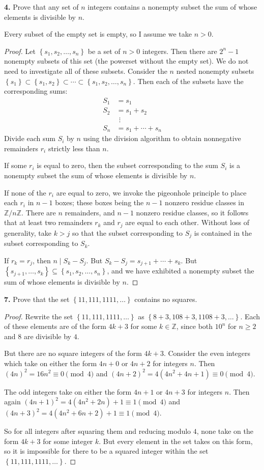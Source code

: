 \documentclass[11pt]{article}
\newcommand{\cbr}[1]{\left\{#1\right\}}
\begin{document}
\textbf{4.} Prove that any set of $n$ integers contains a nonempty subset the sum of whose elements is divisible by $n$.

Every subset of the empty set is empty, so I assume we take $n>0$.
\begin{proof}
    Let $\cbr{s_1,s_2,\dots,s_n}$ be a set of $n>0$ integers. Then there are $2^n-1$ nonempty subsets of this set (the powerset without the empty set). We do not need to investigate all of these subsets. Consider the $n$ nested nonempty subsets $\cbr{s_1}\subset \cbr{s_1,s_2}\subset \cdots \subset \cbr{s_1,s_2,\dots,s_n}$. Then each of the subsets have the corresponding sums:
    \begin{align*}
        S_1 &= s_1 \\
        S_2 &= s_1 + s_2 \\
        &~\,\vdots \\
        S_n &= s_1 + \cdots + s_n 
    \end{align*}
    Divide each sum $S_i$ by $n$ using the division algorithm to obtain nonnegative remainders $r_i$ strictly less than $n$.

    If some $r_i$ is equal to zero, then the subset corresponding to the sum $S_i$ is a nonempty subset the sum of whose elements is divisible by $n$.

    If none of the $r_i$ are equal to zero, we invoke the pigeonhole principle to place each $r_i$ in $n-1$ boxes; these boxes being the $n-1$ nonzero residue classes in $\mathbb{Z}/n\mathbb{Z}$. There are $n$ remainders, and $n-1$ nonzero residue classes, so it follows that at least two remainders $r_k$ and $r_j$ are equal to each other. Without loss of generality, take $k>j$ so that the subset corresponding to $S_j$ is contained in the subset corresponding to $S_k$.

    If $r_k = r_j$, then $n\mid S_k-S_j$. But $S_k - S_j = s_{j+1} + \cdots + s_k$. But $\cbr{s_{j+1},\dots, s_k}\subseteq\cbr{s_1,s_2,\dots,s_n}$, and we have exhibited a nonempty subset the sum of whose elements is divisible by $n$.
\end{proof}
\textbf{7.} Prove that the set $\cbr{11,111,1111,\dots}$ contains no squares.
\begin{proof}
    Rewrite the set $\cbr{11,111,1111,\dots}$ as $\cbr{8+3,108+3,1108+3,\dots}$. Each of these elements are of the form $4k+3$ for some $k\in \mathbb{Z}$, since both $10^n$ for $n\geq 2$ and $8$ are divisible by $4$.

    But there are no square integers of the form $4k+3$. Consider the even integers which take on either the form $4n+0$ or $4n+2$ for integers $n$. Then $(4n)^2 = 16n^2 \equiv 0 \pmod{4}$ and $(4n+2)^2 = 4(4n^2 + 4n + 1) \equiv 0 \pmod{4}$. 

    The odd integers take on either the form $4n+1$ or $4n+3$ for integers $n$. Then again $(4n+1)^2 = 4(4n^2 + 2n) + 1 \equiv 1 \pmod{4}$ and $(4n+3)^2 = 4(4n^2 + 6n + 2) + 1 \equiv 1 \pmod{4}$.

    So for all integers after squaring them and reducing modulo $4$, none take on the form $4k+3$ for some integer $k$. But every element in the set takes on this form, so it is impossible for there to be a squared integer within the set $\cbr{11,111,1111,\dots}$.
\end{proof}
\end{document}
